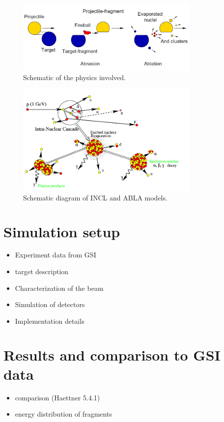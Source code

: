 \begin{figure}
\begin{center}
\includegraphics[width=0.8\textwidth]{images/ablationabration.png}  
\caption{Schematic of the physics involved.}
 \label{fig:ablationabration}
 \end{center}
 \end{figure}
\begin{figure} 
\begin{center}
\includegraphics[width=0.8\textwidth]{images/inclScematic.png}  
\caption{\label{fig:inclschematic} Schematic diagram of INCL and ABLA models.}
 
 \end{center}
 \end{figure}


\section{Simulation setup}
\begin{itemize}
\item Experiment data from GSI
\item target description
\item Characterization of the beam
\item Simulation of detectors
\item Implementation details
\end{itemize}

\section{Results and comparison to GSI data}
\begin{itemize}
\item comparison (Haettner 5.4.1)
\item energy distribution of fragments
\end{itemize}

